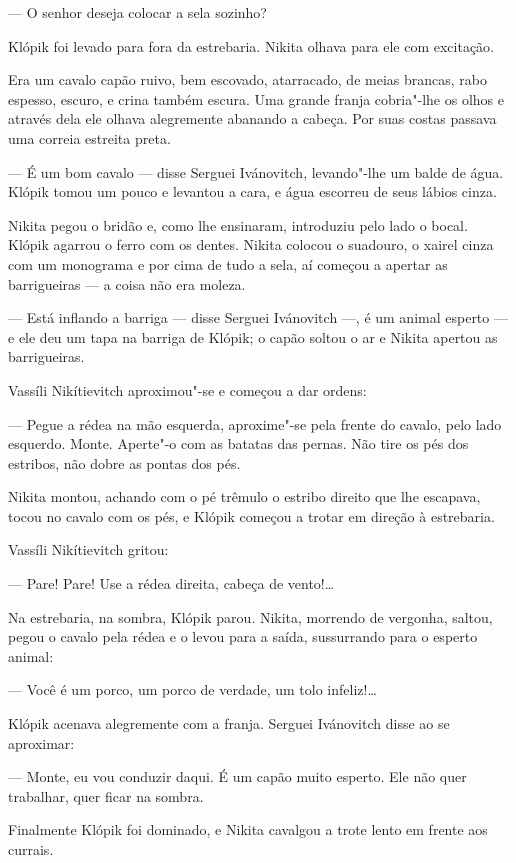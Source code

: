 --- O senhor deseja colocar a sela sozinho?

Klópik foi levado para fora da estrebaria. Nikita olhava para ele com
excitação.

Era um cavalo capão ruivo, bem escovado, atarracado, de meias brancas,
rabo espesso, escuro, e crina também escura. Uma grande franja
cobria"-lhe os olhos e através dela ele olhava alegremente abanando
a cabeça. Por suas costas passava uma correia estreita preta.

--- É um bom cavalo --- disse Serguei Ivánovitch, levando"-lhe um balde
de água. Klópik tomou um pouco e levantou a cara, e água escorreu de
seus lábios cinza.

Nikita pegou o bridão e, como lhe ensinaram, introduziu pelo lado o
bocal. Klópik agarrou o ferro com os dentes. Nikita colocou o suadouro,
o xairel cinza com um monograma e por cima de tudo a sela, aí começou
a apertar as barrigueiras --- a coisa não era moleza.

--- Está inflando a barriga --- disse Serguei Ivánovitch ---, é um
animal esperto --- e ele deu um tapa na barriga de Klópik; o capão
soltou o ar e Nikita apertou as barrigueiras.

Vassíli Nikítievitch aproximou"-se e começou a dar ordens:

--- Pegue a rédea na mão esquerda, aproxime"-se pela frente do cavalo,
pelo lado esquerdo. Monte. Aperte"-o com as batatas das pernas. Não tire
os pés dos estribos, não dobre as pontas dos pés.

Nikita montou, achando com o pé trêmulo o estribo direito que lhe
escapava, tocou no cavalo com os pés, e Klópik começou a trotar em
direção à estrebaria.

Vassíli Nikítievitch gritou:

--- Pare! Pare! Use a rédea direita, cabeça de vento!\ldots{}

Na estrebaria, na sombra, Klópik parou. Nikita, morrendo de vergonha,
saltou, pegou o cavalo pela rédea e o levou para a saída, sussurrando
para o esperto animal:

--- Você é um porco, um porco de verdade, um tolo infeliz!\ldots{}

Klópik acenava alegremente com a franja. Serguei Ivánovitch disse ao se
aproximar:

--- Monte, eu vou conduzir daqui. É um capão muito esperto. Ele não quer
trabalhar, quer ficar na sombra.

Finalmente Klópik foi dominado, e Nikita cavalgou a trote lento em
frente aos currais.

